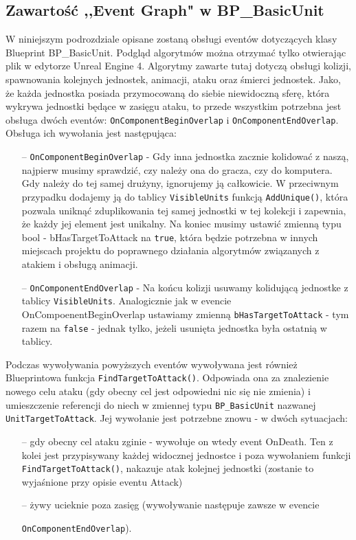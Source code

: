 \documentclass[12pt]{report}
\begin{document}
\subsection{Zawartość ,,Event Graph" w BP\_BasicUnit}
W niniejszym podrozdziale opisane zostaną obsługi eventów dotyczących klasy Blueprint BP\_BasicUnit. Podgląd algorytmów można otrzymać tylko otwierając plik w edytorze Unreal Engine 4. Algorytmy zawarte tutaj dotyczą obsługi kolizji, spawnowania kolejnych jednostek, animacji, ataku oraz śmierci jednostek. Jako, że każda jednostka posiada przymocowaną do siebie niewidoczną sferę, która wykrywa jednostki będące w zasięgu ataku, to przede wszystkim potrzebna jest obsługa dwóch eventów: \texttt{OnComponentBeginOverlap} i \texttt{OnComponentEndOverlap}. Obsługa ich wywołania jest następująca:
\begin{itemize}
\item[--] \texttt{OnComponentBeginOverlap} - Gdy inna jednostka zacznie kolidować z naszą, najpierw musimy sprawdzić, czy należy ona do gracza, czy do komputera. Gdy należy do tej samej drużyny, ignorujemy ją całkowicie. W przeciwnym przypadku dodajemy ją do tablicy \texttt{VisibleUnits} funkcją \texttt{AddUnique()}, która pozwala uniknąć zduplikowania tej samej jednostki w tej kolekcji i zapewnia, że każdy jej element jest unikalny. Na koniec musimy ustawić zmienną typu bool - bHasTargetToAttack na \texttt{true}, która będzie potrzebna w innych miejscach projektu do poprawnego działania algorytmów związanych z atakiem i obsługą animacji.
\item[--] \texttt{OnComponentEndOverlap} - Na końcu kolizji usuwamy kolidującą jednostke z tablicy \texttt{VisibleUnits}. Analogicznie jak w evencie OnCompoenentBeginOverlap ustawiamy zmienną \texttt{bHasTargetToAttack} - tym razem na \texttt{false} - jednak tylko, jeżeli usunięta jednostka była ostatnią w tablicy.
\end{itemize}

Podczas wywoływania powyższych eventów wywoływana jest również Blueprintowa funkcja \texttt{FindTargetToAttack()}. Odpowiada ona za znalezienie nowego celu ataku (gdy obecny cel jest odpowiedni nic się nie zmienia) i umieszczenie referencji do niech w zmiennej typu \texttt{BP\_BasicUnit} nazwanej \texttt{UnitTargetToAttack}. Jej wywołanie jest potrzebne znowu - w dwóch sytuacjach:
\begin{itemize}
\item[--] gdy obecny cel ataku zginie - wywołuje on wtedy event OnDeath. Ten z kolei jest przypisywany każdej widocznej jednostce i poza wywołaniem funkcji \texttt{FindTargetToAttack()}, nakazuje atak kolejnej jednostki (zostanie to wyjaśnione przy opisie eventu Attack)
\item[--] żywy ucieknie poza zasięg (wywoływanie następuje zawsze w evencie

\texttt{OnComponentEndOverlap}).
\end{itemize}
\end{document}
